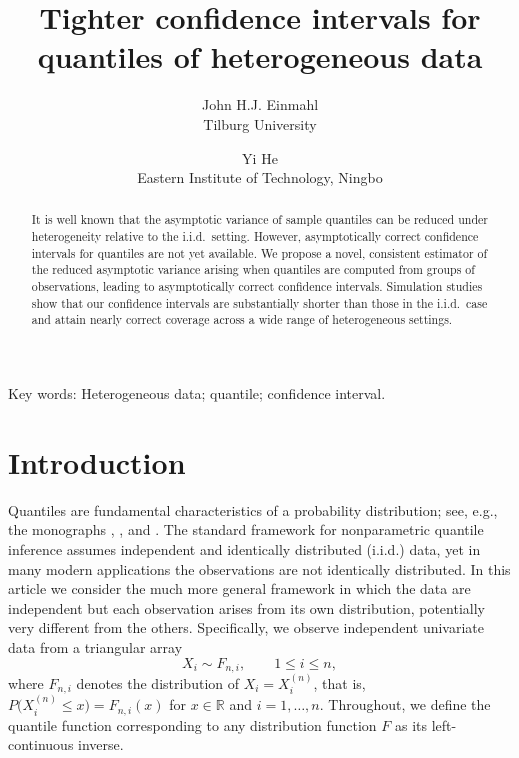 \documentclass[12pt]{article}
\theoremstyle{remark}
\newcommand{\p}{P}
\begin{document}
	
	
	\title{Tighter confidence intervals for quantiles of heterogeneous data}
	
	\author{John H.J. Einmahl\\ Tilburg University\and Yi He \\ Eastern Institute of Technology, Ningbo}
	
	
	\maketitle
	
	\begin{abstract}
		It is well known that the asymptotic variance of sample quantiles can be reduced under heterogeneity relative to the i.i.d.\ setting. However, asymptotically correct confidence intervals for quantiles are  not yet available. We propose a novel, consistent estimator of the reduced asymptotic variance arising when quantiles are computed from groups of observations,  leading to asymptotically correct confidence intervals. Simulation studies show that our confidence intervals are substantially  shorter than those in the i.i.d.\ case and attain nearly correct coverage across a wide range of heterogeneous settings. %
	\end{abstract}
	
Key words: Heterogeneous data; quantile; confidence interval.

\section{Introduction}
Quantiles are fundamental characteristics of a probability distribution; see, e.g., the monographs \cite{R1989}, \cite{DN2004}, and  \cite{ABN2008}. The standard framework for nonparametric quantile inference assumes independent and identically distributed (i.i.d.) data, yet in many modern applications the observations are not identically distributed. 
In this article we consider the much more general framework in which the data are independent but each observation arises from its own distribution, potentially very different from the others. 
Specifically, we observe independent univariate data from a triangular array
\begin{equation*}
	X_i \sim F_{n,i}, \qquad 1 \le i \le n,
\end{equation*}
where $F_{n,i}$ denotes the distribution of $X_i=X_i^{(n)}$, that is, $\p\bigl(X_i^{(n)} \le x\bigr) = F_{n,i}(x)$ for $x \in \mathbb{R}$ and $i = 1,\ldots,n$. Throughout, we define the quantile function corresponding to any distribution function $F$ as its left-continuous inverse.
\end{document}
